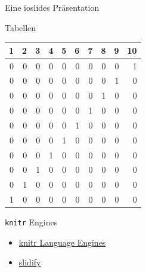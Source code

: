 \documentclass[ignorenonframetext,]{beamer}
\begin{document}
\begin{frame}[fragile]{Eine ioslides Präsentation}
\begin{block}{Tabellen}
\begin{longtable}[]{@{}rrrrrrrrrr@{}}
\toprule
1 & 2 & 3 & 4 & 5 & 6 & 7 & 8 & 9 & 10\tabularnewline
\midrule
\endhead
0 & 0 & 0 & 0 & 0 & 0 & 0 & 0 & 0 & 1\tabularnewline
0 & 0 & 0 & 0 & 0 & 0 & 0 & 0 & 1 & 0\tabularnewline
0 & 0 & 0 & 0 & 0 & 0 & 0 & 1 & 0 & 0\tabularnewline
0 & 0 & 0 & 0 & 0 & 0 & 1 & 0 & 0 & 0\tabularnewline
0 & 0 & 0 & 0 & 0 & 1 & 0 & 0 & 0 & 0\tabularnewline
0 & 0 & 0 & 0 & 1 & 0 & 0 & 0 & 0 & 0\tabularnewline
0 & 0 & 0 & 1 & 0 & 0 & 0 & 0 & 0 & 0\tabularnewline
0 & 0 & 1 & 0 & 0 & 0 & 0 & 0 & 0 & 0\tabularnewline
0 & 1 & 0 & 0 & 0 & 0 & 0 & 0 & 0 & 0\tabularnewline
1 & 0 & 0 & 0 & 0 & 0 & 0 & 0 & 0 & 0\tabularnewline
\bottomrule
\end{longtable}

\end{block}

\begin{block}{\texttt{knitr} Engines}

\begin{itemize}
\item
  \href{http://rmarkdown.rstudio.com/authoring_knitr_engines.html}{knitr
  Language Engines}
\item
  \href{http://slidify.org/}{slidify}
\end{itemize}

\end{block}

\end{frame}
\end{document}
